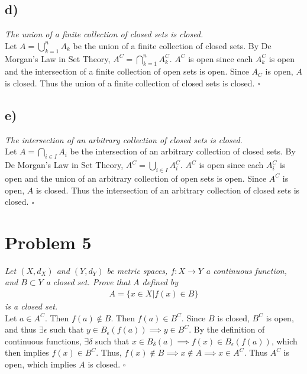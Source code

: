 \documentclass[12pt]{article}
\begin{document}
\subsection*{ d)}
{\it The union of a finite collection of closed sets is closed.} \\

Let $A = \bigcup\limits_{k=1}^{n} A_k$ be the union of a finite collection of closed sets.  By De Morgan's Law in Set Theory, $A^C = \bigcap\limits_{k=1}^{n} A_k^C$.  $A^C$ is open since each $A_k^C$ is open and the intersection of a finite collection of open sets is open.  Since $A_C$ is open, $A$ is closed.  Thus the union of a finite collection of closed sets is closed. \hfill $\square$

\subsection*{ e)}
{\it The intersection of an arbitrary collection of closed sets is closed.} \\

Let $A = \bigcap\limits_{i\in I} A_i$ be the intersection of an arbitrary collection of closed sets.  By De Morgan's Law in Set Theory, $A^C = \bigcup\limits_{i\in I} A_i^C$.  $A^C$ is open since each $A_i^C$ is open and the union of an arbitrary collection of open sets is open.  Since $A^C$ is open, $A$ is closed.  Thus the intersection of an arbitrary collection of closed sets is closed. \hfill $\square$

\section*{Problem 5}
{\it Let $(X, d_X)$ and $(Y, d_Y)$ be metric spaces, $f: X \rightarrow Y$ a continuous function, and $B \subset Y$ a closed set.  Prove that $A$ defined by}
\begin{align*}
	A = \{x \in X | f(x) \in B\}
\end{align*}
{\it is a closed set.} \\

Let $a \in A^C$.  Then $f(a) \notin B$.  Then $f(a) \in B^C$.  Since $B$ is closed, $B^C$ is open, and thus $\exists \epsilon$ such that $y \in B_\epsilon(f(a)) \implies y \in B^C$.  By the definition of continuous functions, $\exists \delta$ such that $x \in B_\delta(a) \implies f(x) \in B_\epsilon(f(a))$, which then implies $f(x) \in B^C$.  Thus, $f(x) \notin B \implies x \notin A \implies x \in A^C$.  Thus $A^C$ is open, which implies $A$ is closed. \hfill $\square$
\end{document}
